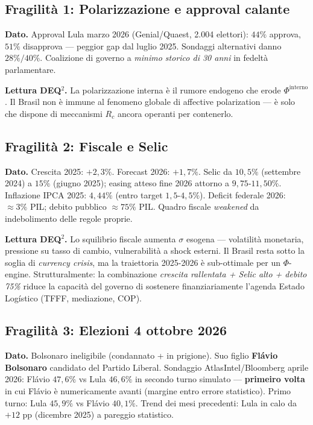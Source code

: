 \subsection{Fragilità 1: Polarizzazione e approval
calante}\label{fragilituxe0-1-polarizzazione-e-approval-calante}

\Proved{} \textbf{Dato.} Approval Lula marzo 2026 (Genial/Quaest, 2.004
elettori): \(44\%\) approva, \(51\%\) disapprova --- peggior gap dal
luglio 2025. Sondaggi alternativi danno \(28\%/40\%\). Coalizione di
governo a \emph{minimo storico di 30 anni} in fedeltà parlamentare.

\Conj{} \textbf{Lettura DEQ$^2$.} La polarizzazione interna è il rumore
endogeno che erode \(\Phi^{\text{interno}}\). Il Brasil non è immune al
fenomeno globale di affective polarization --- è solo che dispone di
meccanismi \(R_c\) ancora operanti per contenerlo.

\subsection{Fragilità 2: Fiscale e
Selic}\label{fragilituxe0-2-fiscale-e-selic}

\Proved{} \textbf{Dato.} Crescita 2025: \(+2{,}3\%\). Forecast 2026:
\(+1{,}7\%\). Selic da \(10{,}5\%\) (settembre 2024) a \(15\%\) (giugno
2025); easing atteso fine 2026 attorno a \(9{,}75\)-\(11{,}50\%\).
Inflazione IPCA 2025: \(4{,}44\%\) (entro target \(1{,}5\)-\(4{,}5\%\)).
Deficit federale 2026: \(\approx 3\%\) PIL; debito pubblico
\(\approx 75\%\) PIL. Quadro fiscale \emph{weakened} da indebolimento
delle regole proprie.

\Conj{} \textbf{Lettura DEQ$^2$.} Lo squilibrio fiscale aumenta \(\sigma\)
esogena --- volatilità monetaria, pressione su tasso di cambio,
vulnerabilità a shock esterni. Il Brasil resta sotto la soglia di
\emph{currency crisis}, ma la traiettoria 2025-2026 è sub-ottimale per
un \(\Phi\)-engine. Strutturalmente: la combinazione \emph{crescita
rallentata + Selic alto + debito 75\%} riduce la capacità del governo di
sostenere finanziariamente l'agenda Estado Logístico (TFFF, mediazione,
COP).

\subsection{Fragilità 3: Elezioni 4 ottobre
2026}\label{fragilituxe0-3-elezioni-4-ottobre-2026}

\Proved{} \textbf{Dato.} Bolsonaro ineligibile (condannato + in
prigione). Suo figlio \textbf{Flávio Bolsonaro} candidato del Partido
Liberal. Sondaggio AtlasIntel/Bloomberg aprile 2026: Flávio \(47{,}6\%\)
vs Lula \(46{,}6\%\) in secondo turno simulato --- \textbf{primeiro volta}
in cui Flávio è numericamente avanti (margine entro errore statistico).
Primo turno: Lula \(45{,}9\%\) vs Flávio \(40{,}1\%\). Trend dei mesi
precedenti: Lula in calo da \(+12\) pp (dicembre 2025) a pareggio
statistico.

